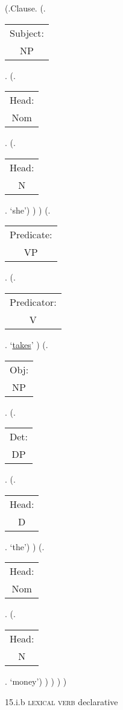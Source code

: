 \documentclass[12pt,letterpaper]{article}
\begin{document}
\begin{figure}
	\begin{center}
		\begin{parsetree}
			(.Clause.
			(.\begin{tabular}{c}Subject:\\NP\end{tabular}.  
			(.\begin{tabular}{c}Head:\\Nom\end{tabular}.
			(.\begin{tabular}{c}Head:\\N\end{tabular}. `she')
			)
			)
			(.\begin{tabular}{c}Predicate:\\VP\end{tabular}.
			(.\begin{tabular}{c}Predicator:\\V\end{tabular}.    `\underline{takes}' )
			(.\begin{tabular}{c}Obj:\\NP\end{tabular}.  
			(.\begin{tabular}{c}Det:\\DP\end{tabular}.  
			(.\begin{tabular}{c}Head:\\D\end{tabular}. `the')
			)
			(.\begin{tabular}{c}Head:\\Nom\end{tabular}.
			(.\begin{tabular}{c}Head:\\N\end{tabular}. `money')
			)
			)
			)
			) 
			
		\end{parsetree}
		\hfill \break \hfill \break
		15.i.b \textsc{lexical verb} declarative
	\end{center}
\end{figure}
\end{document}
